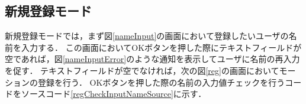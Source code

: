 \documentclass[12pt]{jreport}
\begin{document}
\newpage
        \subsection{新規登録モード}
        新規登録モードでは，まず図\ref{nameInput}の画面において登録したいユーザの名前を入力する．
        この画面においてOKボタンを押した際にテキストフィールドが空であれば，図\ref{nameInputError}のような通知を表示してユーザに名前の再入力を促す．
        テキストフィールドが空でなければ，次の図\ref{reg}の画面においてモーションの登録を行う．
        OKボタンを押した際の名前の入力値チェックを行うコードをソースコード\ref{regCheckInputNameSource}に示す．
\end{document}
